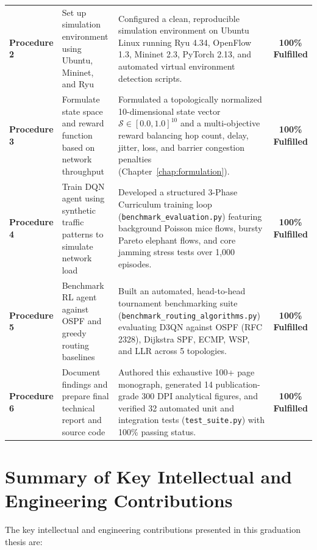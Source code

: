 \documentclass[12pt,a4paper,oneside]{report}
\begin{document}
\begin{table}[htbp]
\begin{tabularx}{\textwidth}{l p{4.0cm} X c}
\addlinespace
\textbf{Procedure 2} & Set up simulation environment using Ubuntu, Mininet, and Ryu & Configured a clean, reproducible simulation environment on Ubuntu Linux running Ryu 4.34, OpenFlow 1.3, Mininet 2.3, PyTorch 2.13, and automated virtual environment detection scripts. & \textbf{100\% Fulfilled} \\
\addlinespace
\textbf{Procedure 3} & Formulate state space and reward function based on network throughput & Formulated a topologically normalized 10-dimensional state vector $\mathcal{S} \in [0.0, 1.0]^{10}$ and a multi-objective reward balancing hop count, delay, jitter, loss, and barrier congestion penalties (Chapter~\ref{chap:formulation}). & \textbf{100\% Fulfilled} \\
\addlinespace
\textbf{Procedure 4} & Train DQN agent using synthetic traffic patterns to simulate network load & Developed a structured 3-Phase Curriculum training loop (\texttt{benchmark\_evaluation.py}) featuring background Poisson mice flows, bursty Pareto elephant flows, and core jamming stress tests over 1,000 episodes. & \textbf{100\% Fulfilled} \\
\addlinespace
\textbf{Procedure 5} & Benchmark RL agent against OSPF and greedy routing baselines & Built an automated, head-to-head tournament benchmarking suite (\texttt{benchmark\_routing\_algorithms.py}) evaluating D3QN against OSPF (RFC 2328), Dijkstra SPF, ECMP, WSP, and LLR across 5 topologies. & \textbf{100\% Fulfilled} \\
\addlinespace
\textbf{Procedure 6} & Document findings and prepare final technical report and source code & Authored this exhaustive 100+ page monograph, generated 14 publication-grade 300 DPI analytical figures, and verified 32 automated unit and integration tests (\texttt{test\_suite.py}) with 100\% passing status. & \textbf{100\% Fulfilled} \\
\bottomrule
\end{tabularx}
\end{table}

\section{Summary of Key Intellectual and Engineering Contributions}
The key intellectual and engineering contributions presented in this graduation thesis are:
\end{document}
